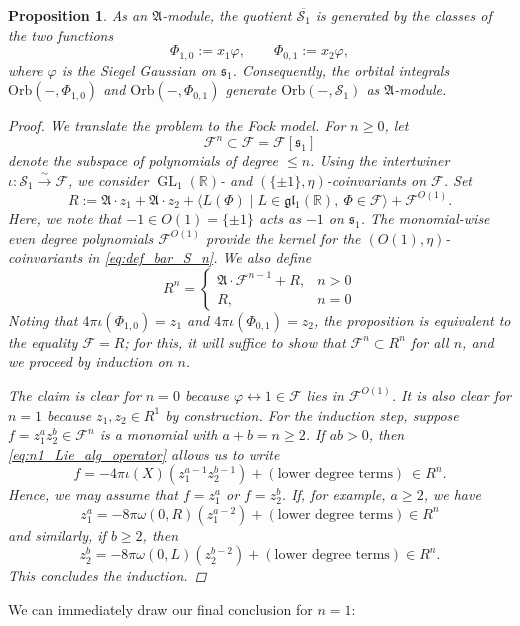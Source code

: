 \documentclass[reqno, 11pt]{amsart} %
\numberwithin{equation}{section}
\theoremstyle{plain}
\newtheorem{proposition}[theorem]{Proposition}
\theoremstyle{definition}
\theoremstyle{remark}
\newcommand{\ov}{\overline}
\newcommand{\mbR}{\mathbb{R}}
\newcommand{\mcF}{\mathcal{F}}
\newcommand{\mcS}{\mathcal{S}}
\newcommand{\mfA}{\mathfrak{A}}
\newcommand{\mfg}{\mathfrak{g}}
\newcommand{\mfl}{\mathfrak{l}}
\newcommand{\mfs}{\mathfrak{s}}
\newcommand{\mfgl}{\mfg\mfl}
\newcommand{\simto}{\overset{\sim}{\to}}
\newcommand{\calF}{\mathcal F}
\newcommand{\lie}[1]{ \mathfrak{#1}}
\DeclareMathOperator{\GL}{GL}
\newcommand{\Orb}{\mathrm{Orb}}
\begin{document}
\begin{proposition} \label{prop:struct_of_S1}
As an $\lie A$-module, the quotient $\ov{\mcS_1}$ is generated by the classes of the two functions
\[
\Phi_{1,0} := x_1 \varphi, \qquad \Phi_{0,1} := x_2 \varphi,
\]
where $\varphi $ is the Siegel Gaussian on $\lie s_1$. Consequently, the orbital integrals $\Orb(-,\Phi_{1,0})$ and $\Orb(-,\Phi_{0,1})$ generate $\Orb(-,\mcS_1)$ as $\mfA$-module.

\begin{proof}
We translate the problem to the Fock model. For $n \geq 0$, let
\[ \calF^n\subset \calF = \calF[\lie s_1] \]
denote the subspace of polynomials of degree $\leq n$. Using the intertwiner $\iota \colon \mathcal S_1 \simto \calF$, we consider $\GL_1(\mbR)$- and $(\{\pm 1\}, η)$-coinvariants on $\mcF$. Set
\[
R := \lie{A} \cdot z_1 +  \lie{A} \cdot z_2 + \langle L(Φ) \mid L\in \mfgl_1(\mbR),\ Φ\in \mcF\rangle + \mcF^{O(1)}.
\]
Here, we note that $-1\in O(1) = \{\pm 1\}$ acts as $-1$ on $\mfs_1$. The monomial-wise even degree polynomials $\mcF^{O(1)}$ provide the kernel for the $(O(1), η)$-coinvariants in \eqref{eq:def_bar_S_n}.
We also define
\[
R^n =  \begin{cases} \lie A \cdot \calF^{n-1} + R, & n > 0 \\ R, & n=0 \end{cases}
\]
Noting that  $4\pi \iota(\Phi_{1,0}) =  z_1$ and $ 4\pi \iota(\Phi_{0,1}) =  z_2$,  the proposition is equivalent to the equality $\calF = R$; for this, it will suffice to show that $\calF^n  \subset  R^n$ for all $n$, and we proceed by induction on $n$.

The claim is clear for $n = 0$ because $φ\leftrightarrow 1 \in \mcF$ lies in $\mcF^{O(1)}$. It is also clear for $n = 1$ because $z_1,z_2\in R^1$ by construction. For the induction step,  suppose $ f= z_1^a z_2^b \in \calF^{n}$ is a monomial with $a+b=n \geq 2$. If $ab > 0$, then \eqref{eq:n1_Lie_alg_operator} allows  us to write
\[
f =  - 4 \pi \iota(X) ( z_1^{a-1} z_2^{b-1} ) +   (\text{lower degree terms}) \ \in R^n.
\]
Hence, we may assume that $f = z_1^a$ or $f= z_2^b$. If, for example, $a \geq 2$, we have
\[
z_1^{a} = -8 \pi \omega(0,R)(z_1^{a-2}) + (\text{lower degree terms}) \in R^n
\]
and similarly, if $b \geq 2$, then
\[
z_2^b = -8 \pi \omega(0,L)(z_2^{b-2}) +(\text{lower degree terms}) \in R^n.
\]
This concludes the induction.
\end{proof}
\end{proposition}

We can immediately draw our final conclusion for $n = 1$:
\end{document}
